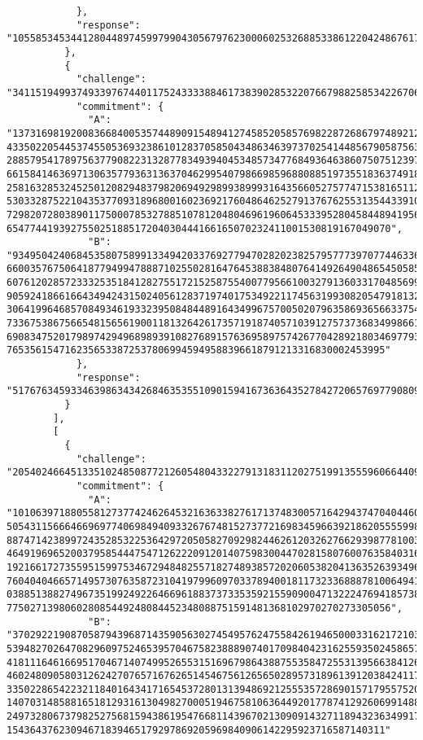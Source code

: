 \begin{lstlisting}
            },
            "response": "10558534534412804489745997990430567976230006025326885338612204248676172306992"
          },
          {
            "challenge": "34115194993749339767440117524333388461738390285322076679882585342267066946683",
            "commitment": {
              "A": "13731698192008366840053574489091548941274585205857698228726867974892123176024   4335022054453745505369323861012837058504348634639737025414485679058756338076048   2885795417897563779082231328778349394045348573477684936463860750751239756184850   6615841463697130635779363136370462995407986698596880885197355183637491805371243   2581632853245250120829483798206949298993899931643566052757747153816511239065031   5303328752210435377093189680016023692176048646252791376762553135443391039170078   7298207280389011750007853278851078120480469619606453339528045844894195665511743   654774419392755025188517204030444166165070232411001530819167049070",
              "B": "93495042406845358075899133494203376927794702820238257957773970774463363021999   6600357675064187794994788871025502816476453883848076414926490486545058569596004   6076120285723332535184128275517215258755400779566100327913603317048569959524542   9059241866166434942431502405612837197401753492211745631993082054791813275891465   3064199646857084934619332395084844891643499675700502079635869365663375410499208   7336753867566548156561900118132642617357191874057103912757373683499866111598971   6908347520179897429496898939108276891576369589757426770428921803469779392688330   76535615471623565338725378069945949588396618791213316830002453995"
            },
            "response": "5176763459334639863434268463535510901594167363643527842720657697790809305897"
          }
        ],
        [
          {
            "challenge": "20540246645133510248508772126054804332279131831120275199135559606644095246601",
            "commitment": {
              "A": "10106397188055812737742462645321636338276171374830057164294374704044606864876   5054311566646696977406984940933267674815273772169834596639218620555599866407048   8874714238997243528532253642972050582709298244626120326276629398778100339569399   4649196965200379585444754712622209120140759830044702815807600763584031643162622   1921661727355951599753467294848255718274893857202060538204136352639349622091128   7604040466571495730763587231041979960970337894001811732336888781006494177264929   0388513882749673519924922646696188373733535921559090047132224769418573899070908   775027139806028085449248084452348088751591481368102970270273305056",
              "B": "37029221908705879439687143590563027454957624755842619465000331621721039896737   5394827026470829609752465395704675823888907401709840423162559350245865771281481   4181116461669517046714074995265531516967986438875535847255313956638412671864829   4602480905803126242707657167626514546756126565028957318961391203842411773921268   3350228654223211840164341716545372801313948692125553572869015717955752028690546   1407031485881651812931613049827000519467581063644920177874129260699148887495652   2497328067379825275681594386195476681143967021309091432711894323634991706766520   15436437623094671839465179297869205969840906142295923716587140311"

\end{lstlisting}
